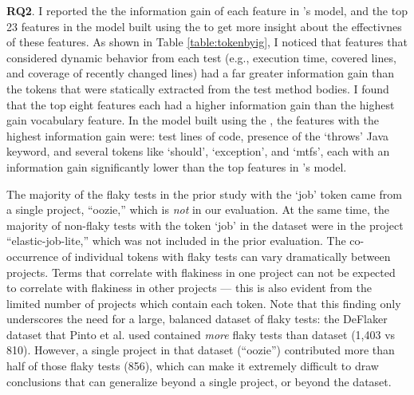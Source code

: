 

\textbf{RQ2}. I reported the the information gain of each feature in \sysName's model, and the top 23 features in the model built using the \vocabName to get more insight about the effectivnes of these features. As shown in Table \ref{table:tokenbyig}, I noticed that features that considered dynamic behavior from each test (e.g., execution time, covered lines, and coverage of recently changed lines) had a far greater information gain than the tokens that were statically extracted from the test method bodies. I found that the top eight \sysName features each had a higher information gain than the highest gain vocabulary feature. In the model built using the \vocabName \cite{pinto2020vocabulary}, the features with the highest information gain were: test lines of code, presence of the `throws' Java keyword, and several tokens like `should', `exception', and `mtfs', each with an information gain significantly lower than the top features in \sysName's model.

The majority of the flaky tests in the prior study with the `job' token came from a single project, ``oozie,'' which is \emph{not} in our evaluation. At the same time, the majority of non-flaky tests with the token `job' in the dataset were in the project ``elastic-job-lite,'' which was not included in the prior evaluation.
The co-occurrence of individual tokens with flaky tests can vary dramatically between projects. Terms that correlate with flakiness in one project can not be expected to correlate with flakiness in other projects --- this is also evident from the limited number of projects which contain each token. Note that this finding only underscores the need for a large, balanced dataset of flaky tests: the DeFlaker dataset that Pinto et al. used contained \emph{more} flaky tests than \sysName dataset (1,403 vs 810). However, a single project in that dataset (``oozie'') contributed more than half of those flaky tests (856), which can make it extremely difficult to draw conclusions that can generalize beyond a single project, or beyond the dataset.

